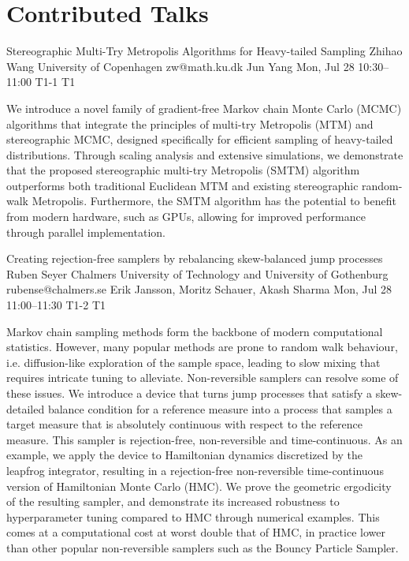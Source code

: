 \section{Contributed Talks}

\begin{talk}
  {Stereographic Multi-Try Metropolis Algorithms for Heavy-tailed Sampling}%
  {Zhihao Wang}%
  {University of Copenhagen}%
  {zw@math.ku.dk}%
  {Jun Yang}%
  {}%
  {Mon, Jul 28 10:30–11:00}%
  {T1-1}%
  {T1}%
  
				
			
We introduce a novel family of gradient-free Markov chain Monte Carlo (MCMC) algorithms that integrate the principles of multi-try Metropolis (MTM) and stereographic MCMC, designed specifically for efficient sampling of heavy-tailed distributions. Through scaling analysis and extensive simulations, we demonstrate that the proposed stereographic multi-try Metropolis (SMTM) algorithm outperforms both traditional Euclidean MTM and existing stereographic random-walk Metropolis. Furthermore, the SMTM algorithm has the potential to benefit from modern hardware, such as GPUs, allowing for improved performance through parallel implementation.
\end{talk}

\begin{talk}
  {Creating rejection-free samplers by rebalancing skew-balanced jump processes}%
  {Ruben Seyer}%
  {Chalmers University of Technology and University of Gothenburg}%
  {rubense@chalmers.se}%
  {Erik Jansson, Moritz Schauer, Akash Sharma}%
  {}%
  {Mon, Jul 28 11:00–11:30}%
  {T1-2}%
  {T1}%
  
				
			
Markov chain sampling methods form the backbone of modern computational statistics.
However, many popular methods are prone to random walk behaviour, i.e.\@{} diffusion-like exploration of the sample space, leading to slow mixing that requires intricate tuning to alleviate.
Non-reversible samplers can resolve some of these issues.
We introduce a device that turns jump processes that satisfy a skew-detailed balance condition for a reference measure into a process that samples a target measure that is absolutely continuous with respect to the reference measure.
This sampler is rejection-free, non-reversible and time-continuous.
As an example, we apply the device to Hamiltonian dynamics discretized by the leapfrog integrator, resulting in a rejection-free non-reversible time-continuous version of Hamiltonian Monte Carlo (HMC).
We prove the geometric ergodicity of the resulting sampler, and demonstrate its increased robustness to hyperparameter tuning compared to HMC through numerical examples.
This comes at a computational cost at worst double that of HMC, in practice lower than other popular non-reversible samplers such as the Bouncy Particle Sampler.
\end{talk}


